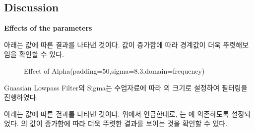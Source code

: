 \documentclass{report}
\begin{document}
\subsection*{Discussion}

\textbf{Effects of the parameters}

아래는  값에 따른 결과를 나타낸 것이다.
 값이 증가함에 따라 경계값이 더욱 뚜렷해보임을 확인할 수 있다.

\begin{figure}[htbp]
    \centering

    \hspace{1pt}
    \hspace{1pt}

    \caption{Effect of Alpha(padding=50,sigma=8.3,domain=frequency)}
\end{figure}

\newpage

Guassian Lowpass Filter의 Sigma는 수업자료에 따라 의 크기로 설정하여 필터링을 진행하였다.

아래는  값에 따른 결과를 나타낸 것이다.
위에서 언급한대로, 는 에 의존하도록 설정되었다.
의 값이 증가함에 따라 더욱 뚜렷한 결과를 보이는 것을 확인할 수 있다.
\end{document}
